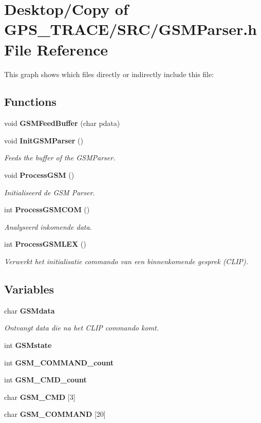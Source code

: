 \section{Desktop/Copy of GPS\_\-TRACE/SRC/GSMParser.h File Reference}
\label{_g_s_m_parser_8h}


This graph shows which files directly or indirectly include this file:\subsection*{Functions}
\begin{CompactItemize}
\item 
void {\bf GSMFeedBuffer} (char pdata)
\item 
void {\bf InitGSMParser} ()
\begin{CompactList}\small\item\em Feeds the buffer of the GSMParser. \item\end{CompactList}\item 
void {\bf ProcessGSM} ()
\begin{CompactList}\small\item\em Initialiseerd de GSM Parser. \item\end{CompactList}\item 
int {\bf ProcessGSMCOM} ()
\begin{CompactList}\small\item\em Analyseerd inkomende data. \item\end{CompactList}\item 
int {\bf ProcessGSMLEX} ()
\begin{CompactList}\small\item\em Verwerkt het initialisatie commando van een binnenkomende gesprek (CLIP). \item\end{CompactList}\end{CompactItemize}
\subsection*{Variables}
\begin{CompactItemize}
\item 
char {\bf GSMdata}
\begin{CompactList}\small\item\em Ontvangt data die na het CLIP commando komt. \item\end{CompactList}\item 
int {\bf GSMstate}
\item 
int {\bf GSM\_\-COMMAND\_\-count}
\item 
int {\bf GSM\_\-CMD\_\-count}
\item 
char {\bf GSM\_\-CMD} [3]
\item 
char {\bf GSM\_\-COMMAND} [20]
\end{CompactItemize}


